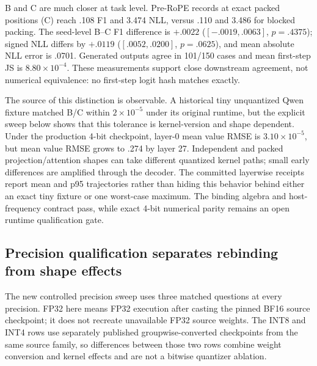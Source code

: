 \documentclass[11pt]{article}
\begin{document}
\begin{table}[ht]
\centering
\caption{Five-seed pre-RoPE causal decomposition (150 questions). All
conditions share frozen retrieval and packed positions. Official is the
MultiHop-RAG token-intersection score. Edges count allowed
document-to-document attention pairs; query visibility is unchanged.}
\label{tab:prerope-causal-quality}
\small
\resizebox{\linewidth}{!}{}
\end{table}

B and C are much closer at task level. Pre-RoPE records at exact packed
positions (C) reach .108 F1 and 3.474 NLL, versus .110 and 3.486 for blocked
packing. The seed-level B--C F1 difference is $+.0022$
($[-.0019,.0063]$, $p=.4375$); signed NLL differs by $+.0119$
($[.0052,.0200]$, $p=.0625$), and mean absolute NLL error is .0701.
Generated outputs agree in 101/150 cases and mean first-step JS is
$8.80\times10^{-4}$. These measurements support close downstream agreement,
not numerical equivalence: no first-step logit hash matches exactly.

\begin{table}[ht]
\centering
\caption{Blocked packed encoding (B) versus independently encoded pre-RoPE
records rebound to B's coordinates (C). Worst-layer values are maxima over
all five runs.}
\label{tab:prerope-bc-fidelity}
\small

\end{table}

The source of this distinction is observable. A historical tiny unquantized
Qwen fixture matched B/C within $2\times10^{-5}$ under its original runtime,
but the explicit sweep below shows that this tolerance is kernel-version and
shape dependent. Under the production 4-bit checkpoint, layer-0 mean value RMSE is
$3.10\times10^{-5}$, but mean value RMSE grows to .274 by layer 27.
Independent and packed projection/attention shapes can take different
quantized kernel paths; small early differences are amplified through the
decoder. The committed layerwise receipts report mean and p95 trajectories
rather than hiding this behavior behind either an exact tiny fixture or one
worst-case maximum. The binding algebra and host-frequency contract pass,
while exact 4-bit numerical parity remains an open runtime qualification gate.

\subsection{Precision qualification separates rebinding from shape effects}
The new controlled precision sweep uses three matched questions at every
precision. FP32 here means FP32 execution after casting the pinned BF16 source
checkpoint; it does not recreate unavailable FP32 source weights. The INT8
and INT4 rows use separately published groupwise-converted checkpoints from
the same source family, so differences between those two rows combine weight
conversion and kernel effects and are not a bitwise quantizer ablation.
\end{document}
